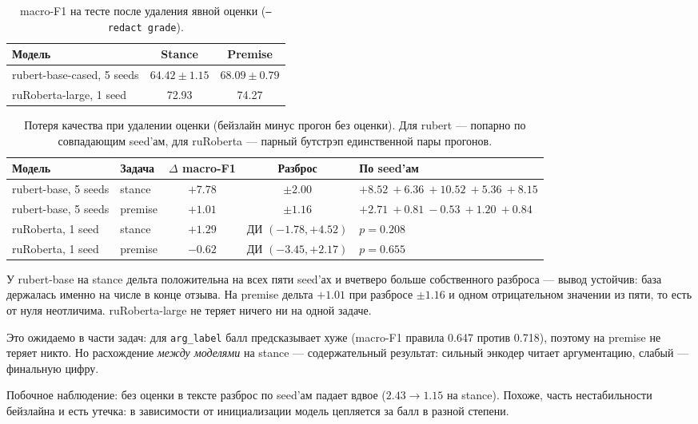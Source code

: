 \documentclass{article}
\begin{document}
\begin{table}[!tbh]
\centering
\begin{tabular}{lcc}
\toprule
Модель & Stance & Premise \\
\midrule
rubert-base-cased, 5 seeds & $64.42 \pm 1.15$ & $68.09 \pm 0.79$ \\
ruRoberta-large, 1 seed    & 72.93            & 74.27 \\
\bottomrule
\end{tabular}
\caption{macro-F1 на тесте после удаления явной оценки (\texttt{--redact grade}).}
\label{tab:nograde}
\end{table}

\begin{table}[!tbh]
\centering
\begin{tabular}{llccl}
\toprule
Модель & Задача & $\Delta$ macro-F1 & Разброс & По seed'ам \\
\midrule
rubert-base, 5 seeds & stance  & $\mathbf{+7.78}$ & $\pm 2.00$ & $+8.52\ +6.36\ +10.52\ +5.36\ +8.15$ \\
rubert-base, 5 seeds & premise & $+1.01$ & $\pm 1.16$ & $+2.71\ +0.81\ -0.53\ +1.20\ +0.84$ \\
ruRoberta, 1 seed    & stance  & $+1.29$ & ДИ $(-1.78, +4.52)$ & $p=0.208$ \\
ruRoberta, 1 seed    & premise & $-0.62$ & ДИ $(-3.45, +2.17)$ & $p=0.655$ \\
\bottomrule
\end{tabular}
\caption{Потеря качества при удалении оценки (бейзлайн минус прогон без оценки).
Для rubert --- попарно по совпадающим seed'ам, для ruRoberta --- парный бутстрэп
единственной пары прогонов.}
\label{tab:delta}
\end{table}

У rubert-base на stance дельта положительна на всех пяти seed'ах и вчетверо больше
собственного разброса --- вывод устойчив: база держалась именно на числе в конце отзыва.
На premise дельта $+1.01$ при разбросе $\pm 1.16$ и одном отрицательном значении из пяти,
то есть от нуля неотличима. ruRoberta-large не теряет ничего ни на одной задаче.

Это ожидаемо в части задач: для \texttt{arg\_label} балл предсказывает хуже
(macro-F1 правила 0.647 против 0.718), поэтому на premise не теряет никто. Но расхождение
\emph{между моделями} на stance --- содержательный результат: сильный энкодер читает
аргументацию, слабый --- финальную цифру.

Побочное наблюдение: без оценки в тексте разброс по seed'ам падает вдвое
($2.43 \to 1.15$ на stance). Похоже, часть нестабильности бейзлайна и есть утечка:
в зависимости от инициализации модель цепляется за балл в разной степени.
\end{document}
